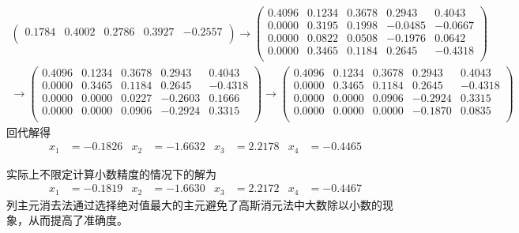 \documentclass{sjtuarticle}
\begin{document}
\begin{itemize}
\begin{solution}
\begin{itemize}
\begin{align*}
\begin{pmatrix}
                0.1784 &       0.4002 &       0.2786 &       0.3927 &       -0.2557\\
          \end{pmatrix}\rightarrow
          \begin{pmatrix}
                0.4096 &       0.1234 &       0.3678 &       0.2943 &        0.4043\\
                0.0000 &       0.3195 &       0.1998 &      -0.0485 &       -0.0667\\
                0.0000 &       0.0822 &       0.0508 &      -0.1976 &        0.0642\\
                0.0000 &       0.3465 &       0.1184 &       0.2645 &       -0.4318\\
          \end{pmatrix}\\
          \rightarrow\begin{pmatrix}
                0.4096 &       0.1234 &       0.3678 &       0.2943 &        0.4043\\
                0.0000 &       0.3465 &       0.1184 &       0.2645 &       -0.4318\\
                0.0000 &       0.0000 &       0.0227 &      -0.2603 &        0.1666\\
                0.0000 &       0.0000 &       0.0906 &      -0.2924 &        0.3315\\
          \end{pmatrix}\rightarrow
          \begin{pmatrix}
                0.4096 &       0.1234 &       0.3678 &       0.2943 &        0.4043\\
                0.0000 &       0.3465 &       0.1184 &       0.2645 &       -0.4318\\
                0.0000 &       0.0000 &       0.0906 &      -0.2924 &        0.3315\\
                0.0000 &       0.0000 &       0.0000 &      -0.1870 &        0.0835\\
          \end{pmatrix}
        \end{align*}
        回代解得
        \begin{align*}
            x_1&=     -0.1826 & x_2&=     -1.6632 & x_3&=      2.2178 & x_4&=     -0.4465
        \end{align*}

        实际上不限定计算小数精度的情况下的解为
        \begin{align*}
            x_1&=     -0.1819 & x_2&=     -1.6630 & x_3&=      2.2172 & x_4&=     -0.4467
        \end{align*}
        列主元消去法通过选择绝对值最大的主元避免了高斯消元法中大数除以小数的现象，从而提高了准确度。


\end{itemize}
\end{solution}
\end{itemize}
\end{document}
